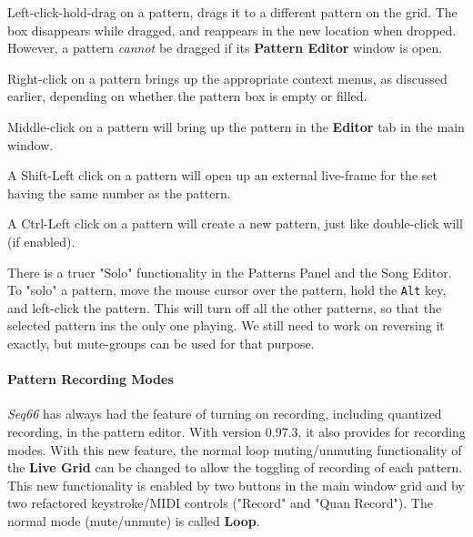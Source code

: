    Left-click-hold-drag on a pattern, drags it to a different
   pattern on the grid.
   The box disappears while dragged, and reappears in the new location when
   dropped.  However, a pattern \textsl{cannot} be dragged if its
   \textbf{Pattern Editor} window is open.

   Right-click on a pattern brings up the appropriate context menus, as
   discussed earlier, depending on whether the pattern box is empty or
   filled.

   Middle-click on a pattern will bring up the pattern in the \textbf{Editor}
   tab in the main window.

   A Shift-Left click on a pattern will open up an external live-frame for the
   set having the same number as the pattern.

   A Ctrl-Left click on a pattern will create a new pattern, just like
   double-click will (if enabled).

   There is a truer "Solo" functionality in the Patterns
   Panel and the Song Editor.  To "solo" a pattern, move the mouse cursor
   over the pattern, hold the \texttt{Alt} key, and left-click the pattern.
   This will turn off all the other patterns, so that the selected pattern ins
   the only one playing.
   We still need to work on reversing it exactly, but
   mute-groups can be used for that purpose.

\paragraph{Pattern Recording Modes}
\label{paragraph:patterns_recording_modes}

   \textsl{Seq66} has always had the feature of turning on recording, including
   quantized recording, in the pattern editor.
   With version 0.97.3, it also provides for
   recording modes.  With this new feature, the normal loop muting/unmuting
   functionality of the \textbf{Live Grid} can be changed to allow the toggling
   of recording of each pattern.
   This new functionality is enabled by two buttons in the main window grid and
   by two refactored keystroke/MIDI controls ("Record" and "Quan Record").
   The normal mode (mute/unmute) is called \textbf{Loop}.

